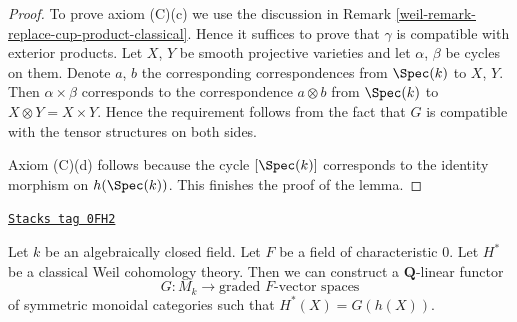 \begin{proof}
\medskip\noindent
To prove axiom (C)(c) we use the discussion in
Remark \ref{weil-remark-replace-cup-product-classical}.
Hence it suffices to prove that $\gamma$ is compatible with
exterior products. Let $X$, $Y$ be smooth projective varieties and
let $\alpha$, $\beta$ be cycles on them. Denote
$a$, $b$ the corresponding correspondences from $\Spec(k)$ to
$X$, $Y$. Then $\alpha \times \beta$ corresponds to the
correspondence $a \otimes b$ from $\Spec(k)$ to $X \otimes Y = X \times Y$.
Hence the requirement follows from the fact that $G$ is
compatible with the tensor structures on both sides.

\medskip\noindent
Axiom (C)(d) follows because the cycle $[\Spec(k)]$
corresponds to the identity morphism on $h(\Spec(k))$.
This finishes the proof of the lemma.
\end{proof}

\begin{lemma}
\label{weil-lemma-from-weil-to-functor-classical}
\href{https://stacks.math.columbia.edu/tag/0FH2}{\texttt{Stacks tag 0FH2}}

Let $k$ be an algebraically closed field. Let $F$ be a field of
characteristic $0$. Let $H^*$ be a classical Weil cohomology theory.
Then we can construct a $\mathbf{Q}$-linear functor
$$
G : M_k \longrightarrow \text{graded }F\text{-vector spaces}
$$
of symmetric monoidal categories such that $H^*(X) = G(h(X))$.
\end{lemma}

